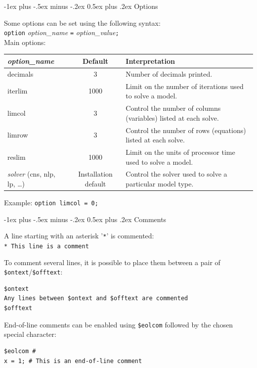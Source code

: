 \documentclass[10pt,landscape,a4paper]{article}
\makeatletter
\renewcommand{\section}{\@startsection{section}{1}{0mm}%
                                {-1ex plus -.5ex minus -.2ex}%
                                {0.5ex plus .2ex}%
                                {\color{blue}\normalfont\large\bfseries}}
\makeatother
\begin{document}
\begin{multicols}{2}
\section{Options}

Some options can be set using the following syntax:\\
\texttt{option} \emph{option\_name} \texttt{=} \emph{option\_value}\texttt{;}\\
Main options:\\
\begin{tabularx}{\columnwidth}{@{}>{\ttfamily}lcX@{}}
  \emph{\textrm{option\_name}} & Default & Interpretation \\
  \toprule
  decimals & 3 & Number of decimals printed.\\
  iterlim& 1000 & Limit on the number of iterations used to solve a model. \\
  limcol& 3 & Control the number of columns (variables) listed at each solve.\\
  limrow& 3 & Control the number of rows (equations) listed at each solve.\\
  reslim& 1000 & Limit on the units of processor time used to solve a model.\\
  \emph{\textrm{solver}} \textrm{(}cns\textrm{, }nlp\textrm{, }lp\textrm{, \ldots)}&
  Installation default& Control the solver used to solve a particular model type.
\end{tabularx}
Example: \texttt{option limcol = 0;}

\section{Comments}

A line starting with an asterisk '\verb!*!' is commented:\\
\verb!* This line is a comment!

To comment several lines, it is possible to place them between a pair of
\verb!$ontext!/\verb!$offtext!:\\
\begin{verbatim}
$ontext
Any lines between $ontext and $offtext are commented
$offtext
\end{verbatim}

End-of-line comments can be enabled using \verb!$eolcom! followed by the
chosen special character:\\
\begin{verbatim}
$eolcom #
x = 1; # This is an end-of-line comment
\end{verbatim}


\end{multicols}
\end{document}
